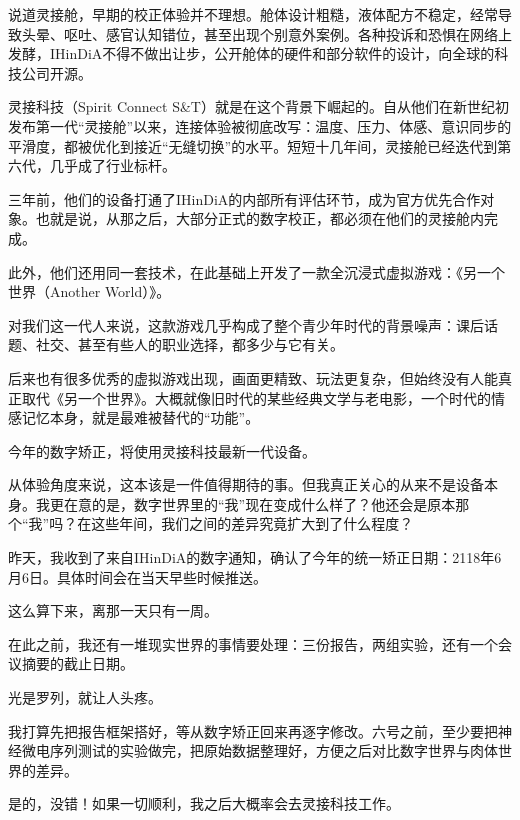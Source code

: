 说道灵接舱，早期的校正体验并不理想。舱体设计粗糙，液体配方不稳定，经常导致头晕、呕吐、感官认知错位，甚至出现个别意外案例。各种投诉和恐惧在网络上发酵，IHinDiA不得不做出让步，公开舱体的硬件和部分软件的设计，向全球的科技公司开源。

灵接科技（Spirit Connect S\&T）就是在这个背景下崛起的。自从他们在新世纪初发布第一代“灵接舱”以来，连接体验被彻底改写：温度、压力、体感、意识同步的平滑度，都被优化到接近“无缝切换”的水平。短短十几年间，灵接舱已经迭代到第六代，几乎成了行业标杆。

三年前，他们的设备打通了IHinDiA的内部所有评估环节，成为官方优先合作对象。也就是说，从那之后，大部分正式的数字校正，都必须在他们的灵接舱内完成。

此外，他们还用同一套技术，在此基础上开发了一款全沉浸式虚拟游戏：《另一个世界（Another World）》。

对我们这一代人来说，这款游戏几乎构成了整个青少年时代的背景噪声：课后话题、社交、甚至有些人的职业选择，都多少与它有关。

后来也有很多优秀的虚拟游戏出现，画面更精致、玩法更复杂，但始终没有人能真正取代《另一个世界》。大概就像旧时代的某些经典文学与老电影，一个时代的情感记忆本身，就是最难被替代的“功能”。

今年的数字矫正，将使用灵接科技最新一代设备。

从体验角度来说，这本该是一件值得期待的事。但我真正关心的从来不是设备本身。我更在意的是，数字世界里的“我”现在变成什么样了？他还会是原本那个“我”吗？在这些年间，我们之间的差异究竟扩大到了什么程度？

昨天，我收到了来自IHinDiA的数字通知，确认了今年的统一矫正日期：2118年6月6日。具体时间会在当天早些时候推送。

这么算下来，离那一天只有一周。

在此之前，我还有一堆现实世界的事情要处理：三份报告，两组实验，还有一个会议摘要的截止日期。

光是罗列，就让人头疼。

我打算先把报告框架搭好，等从数字矫正回来再逐字修改。六号之前，至少要把神经微电序列测试的实验做完，把原始数据整理好，方便之后对比数字世界与肉体世界的差异。

是的，没错！如果一切顺利，我之后大概率会去灵接科技工作。
